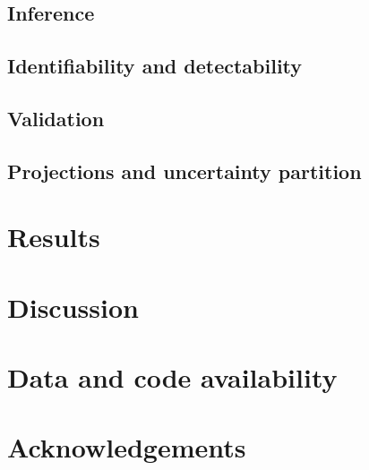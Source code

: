 \documentclass[11pt]{article}
\begin{document}
\subsection{Inference}

\subsection{Identifiability and detectability}

\subsection{Validation}

\subsection{Projections and uncertainty partition}

\section{Results}

\section{Discussion}

\section*{Data and code availability}

\section*{Acknowledgements}



\end{document}

